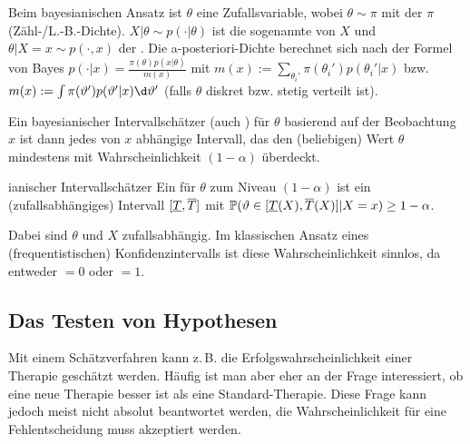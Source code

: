 \linie

\begin{Bem}
    Beim bayesianischen Ansatz ist $\theta$ eine Zufallsvariable,
    wobei $\theta \sim \pi$ mit der  $\pi$ (Zähl-/L.-B.-Dichte).
    $X|\theta \sim p(\cdot|\theta)$ ist die sogenannte  von $X$ und
    $\theta|X=x \sim p(\cdot,x)$ der .
    Die a-posteriori-Dichte berechnet sich nach der Formel von Bayes
    $p(\cdot|x) = \frac{\pi(\theta) p(x|\theta)}{m(x)}$ mit
    $m(x) := \sum_{\theta_i'} \pi(\theta_i') p(\theta_i'|x)$ bzw.
    $m(x) := \int \pi(\theta') p(\theta'|x) \d\theta'$
    (falls $\theta$ diskret bzw. stetig verteilt ist).
    
    Ein bayesianischer Intervallschätzer (auch ) für $\theta$
    basierend auf der Beobachtung $x$ ist dann jedes von $x$ abhängige Intervall, das den
    (beliebigen) Wert $\theta$ mindestens mit Wahrscheinlichkeit $(1 - \alpha)$ überdeckt.
\end{Bem}

\begin{Def}{ianischer Intervallschätzer}
    Ein  für $\theta$ zum Niveau $(1 - \alpha)$
    ist ein (zufallsabhängiges) Intervall $[\underline{T}, \overline{T}]$ mit
    $\mathbb{P}(\vartheta \in [\underline{T}(X), \overline{T}(X)]|X=x) \ge 1 - \alpha$.
\end{Def}

\begin{Bem}
    Dabei sind $\theta$ und $X$ zufallsabhängig.
    Im klassischen Ansatz eines (frequentistischen) Konfidenzintervalls ist diese
    Wahrscheinlichkeit sinnlos, da entweder $= 0$ oder $= 1$.
\end{Bem}

\pagebreak

\subsection{%
    Das Testen von Hypothesen%
}

\begin{Bem}
    Mit einem Schätzverfahren kann z.\,B. die Erfolgswahrscheinlichkeit
    einer Therapie geschätzt werden.
    Häufig ist man aber eher an der Frage interessiert, ob eine neue Therapie besser ist als
    eine Standard-Therapie.
    Diese Frage kann jedoch meist nicht absolut beantwortet werden, die Wahrscheinlichkeit für eine
    Fehlentscheidung muss akzeptiert werden.
\end{Bem}

